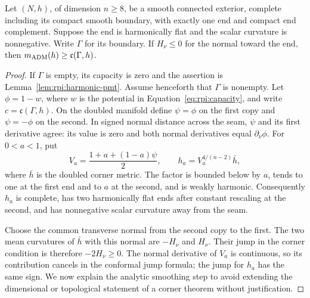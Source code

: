 \begin{lemma}
\label{lem:rpi:mass-capacity}
Let $(N,h)$, of dimension $n\ge8$, be a smooth connected exterior,
complete including its compact smooth boundary, with exactly one end
and compact end complement. Suppose the end is harmonically flat
and the scalar curvature is nonnegative. Write $\Gamma$ for its
boundary. If $H_\nu\le0$ for the normal toward the end, then
$m_{\rm ADM}(h)\ge\mathfrak c(\Gamma,h)$.
\end{lemma}
\begin{proof}
If $\Gamma$ is empty, its capacity is zero and the assertion is
Lemma~\ref{lem:rpi:harmonic-pmt}. Assume henceforth that $\Gamma$
is nonempty. Let $\phi=1-w$, where $w$ is the potential in
Equation~\eqref{eq:rpi:capacity}, and write $c=\mathfrak c(\Gamma,h)$.
On the doubled manifold define $\psi=\phi$ on the first copy and
$\psi=-\phi$ on the second. In signed normal distance across the seam,
$\psi$ and its first derivative agree: its value is zero and both
normal derivatives equal $\partial_\nu\phi$. For $0<a<1$, put
\[
 V_a=\frac{1+a+(1-a)\psi}{2},\qquad
 h_a=V_a^{4/(n-2)}\bar h,
\]
where $\bar h$ is the doubled corner metric. The factor is bounded
below by $a$, tends to one at the first end and to $a$ at the second,
and is weakly harmonic. Consequently $h_a$ is complete, has two
harmonically flat ends after constant rescaling at the second, and has
nonnegative scalar curvature away from the seam.

Choose the common transverse normal from the second copy to the first.
The two mean curvatures of $\bar h$ with this normal are $-H_\nu$ and
$H_\nu$. Their jump in the corner condition is therefore $-2H_\nu\ge0$.
The normal derivative of $V_a$ is continuous, so its contribution
cancels in the conformal jump formula; the jump for $h_a$ has the same
sign. We now explain the analytic smoothing step to avoid extending
the dimensional or topological statement of a corner theorem without
justification.


\end{proof}
